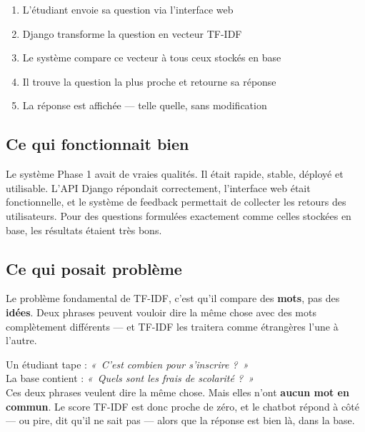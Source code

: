 \documentclass[11pt,a4paper]{article}
\begin{document}
\begin{info}
\begin{enumerate}
    \item L'étudiant envoie sa question via l'interface web
    \item Django transforme la question en vecteur TF-IDF
    \item Le système compare ce vecteur à tous ceux stockés en base
    \item Il trouve la question la plus proche et retourne sa réponse
    \item La réponse est affichée --- telle quelle, sans modification
\end{enumerate}
\end{info}

\subsection{Ce qui fonctionnait bien}

Le système Phase 1 avait de vraies qualités. Il était rapide,
stable, déployé et utilisable. L'API Django répondait correctement,
l'interface web était fonctionnelle, et le système de feedback
permettait de collecter les retours des utilisateurs. Pour des
questions formulées exactement comme celles stockées en base,
les résultats étaient très bons.

\subsection{Ce qui posait problème}

Le problème fondamental de TF-IDF, c'est qu'il compare des
\textbf{mots}, pas des \textbf{idées}. Deux phrases peuvent vouloir
dire la même chose avec des mots complètement différents --- et
TF-IDF les traitera comme étrangères l'une à l'autre.

\begin{exemple}
Un étudiant tape : \textit{«~C'est combien pour s'inscrire ?~»} \\
La base contient : \textit{«~Quels sont les frais de scolarité ?~»} \\
\vspace{0.3cm}
Ces deux phrases veulent dire la même chose. Mais elles n'ont
\textbf{aucun mot en commun}. Le score TF-IDF est donc proche
de zéro, et le chatbot répond à côté --- ou pire, dit qu'il ne
sait pas --- alors que la réponse est bien là, dans la base.
\end{exemple}
\end{document}
